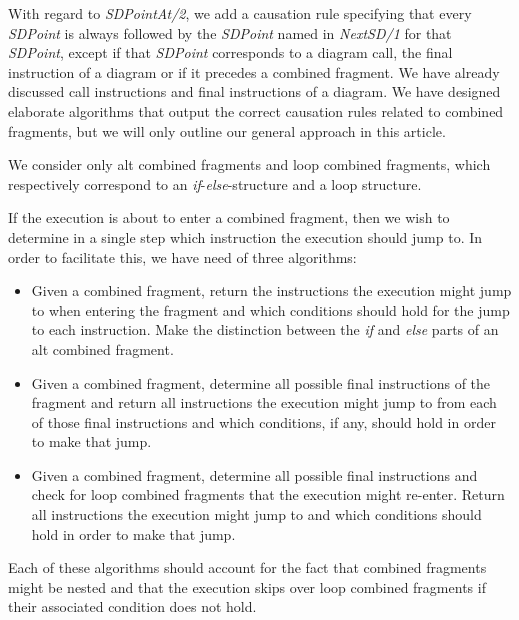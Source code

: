 \documentclass[conference]{IEEEtran}
\begin{document}
With regard to \textit{SDPointAt/2}, we add a causation rule specifying that every \textit{SDPoint} is always followed by the \textit{SDPoint} named in \textit{NextSD/1} for that \textit{SDPoint}, except if that \textit{SDPoint} corresponds to a diagram call, the final instruction of a diagram or if it precedes a combined fragment. We have already discussed call instructions and final instructions of a diagram. We have designed elaborate algorithms that output the correct causation rules related to combined fragments, but we will only outline our general approach in this article.

We consider only alt combined fragments and loop combined fragments, which respectively correspond to an \textit{if}-\textit{else}-structure and a loop structure.

If the execution is about to enter a combined fragment, then we wish to determine in a single step which instruction the execution should jump to. In order to facilitate this, we have need of three algorithms:

\begin{itemize}
	\item Given a combined fragment, return the instructions the execution might jump to when entering the fragment and which conditions should hold for the jump to each instruction. Make the distinction between the \textit{if} and \textit{else} parts of an alt combined fragment.
	\item Given a combined fragment, determine all possible final instructions of the fragment and return all instructions the execution might jump to from each of those final instructions and which conditions, if any, should hold in order to make that jump.
	\item Given a combined fragment, determine all possible final instructions and check for loop combined fragments that the execution might re-enter. Return all instructions the execution might jump to and which conditions should hold in order to make that jump.
\end{itemize} 

Each of these algorithms should account for the fact that combined fragments might be nested and that the execution skips over loop combined fragments if their associated condition does not hold.
\end{document}
